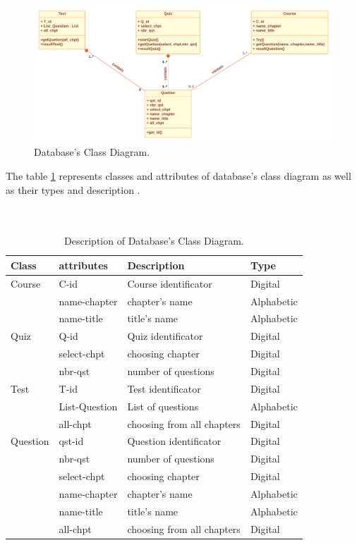 \begin{figure}[ht]
	\centering
	\label{}\includegraphics[scale=0.45]{img/BDD class.pdf}                
	\caption{Database's Class Diagram.} 
	\label{fig:BDD DC}
\end{figure} 



The table \ref{tab:BDD DC} represents classes and attributes of database's class diagram as well as their types and description .\\\\\\
\newpage
\begin{table}[h!]
	\begin{center}
		\begin{tabular}{ |p{3cm}|p{3cm}|p{4cm}|p{2cm}|  }
 		\hline
 		Class & attributes & Description & Type \\
 		\hline \hline
 		Course & C-id & Course identificator & Digital  \\
			& name-chapter & chapter's name & Alphabetic \\
			& name-title & title's name & Alphabetic \\
		\hline
		Quiz & Q-id & Quiz identificator & Digital  \\
			& select-chpt & choosing chapter & Digital \\
			& nbr-qst & number of questions & Digital \\
		\hline
		Test & T-id & Test identificator & Digital  \\
			& List-Question & List of questions & Alphabetic \\
			& all-chpt & choosing from all chapters & Digital \\
		\hline
		Question & qst-id & Question identificator & Digital  \\
			& nbr-qst & number of questions & Digital \\
			& select-chpt & choosing chapter & Digital \\
			& name-chapter & chapter's name & Alphabetic \\
			& name-title & title's name & Alphabetic \\
			& all-chpt & choosing from all chapters & Digital \\
		\hline
\end{tabular}
\end{center}
\caption{Description of Database's Class Diagram.}
\label{tab:BDD DC}
\end{table}


